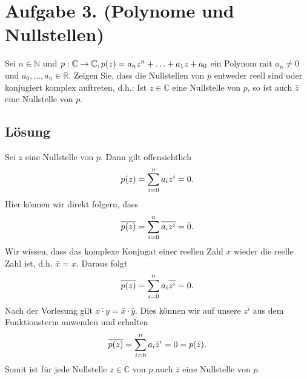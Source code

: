 \documentclass[german,12pt]{homework}
\newcommand{\NN}{\mathbb{N}}
\newcommand{\RR}{\mathbb{R}}
\newcommand{\CC}{\mathbb{C}}
\DeclarePairedDelimiter{\enbrace}{(}{)}
\begin{document}
\begin{enumerate}
\begin{center}
        \end{center}
    \end{enumerate}

    \section*{Aufgabe 3. (Polynome und Nullstellen)}

    \begin{problem}
        Sei \(n \in \NN\) und \(p: \CC \to \CC, p\enbrace*{z} = a_nz^n + \ldots
        + a_1z + a_0\) ein Polynom mit \(a_n \ne 0\) und \(a_0, \ldots, a_n \in
        \RR\). Zeigen Sie, dass die Nullstellen von \(p\) entweder reell sind
        oder konjugiert komplex auftreten, d.h.: Ist \(z \in \CC\) eine
        Nullstelle von \(p\), so ist auch \(\bar{z}\) eine Nullstelle von \(p\).
    \end{problem}

    \subsection*{Lösung} Sei \(z\) eine Nullstelle von \(p\). Dann gilt
    offensichtlich
    \[p\enbrace*{z} = \sum_{i = 0}^na_iz^i = 0.\]
    Hier können wir direkt folgern, dass
    \[\overline{p\enbrace*{z}} = \sum_{i = 0}^n\overline{a_iz^i} = \bar{0}.\]
    Wir wissen, dass das komplexe Konjugat einer reellen Zahl \(x\) wieder die
    reelle Zahl ist, d.h. \(\bar{x} = x\). Daraus folgt
    \[\overline{p\enbrace*{z}} = \sum_{i = 0}^na_i\overline{z^i} = 0.\]
    Nach der Vorlesung gilt \(\overline{x \cdot y} = \bar{x} \cdot \bar{y}\).
    Dies können wir auf unsere \(z^i\) aus dem Funktionsterm anwenden und
    erhalten
    \[\overline{p\enbrace*{z}} = \sum_{i = 0}^na_i\bar{z}^i = 0 =
    p\enbrace*{\bar{z}}.\]
    Somit ist für jede Nullstelle \(z \in \CC\) von \(p\) auch \(\bar{z}\) eine
    Nullstelle von \(p\).
\end{document}
